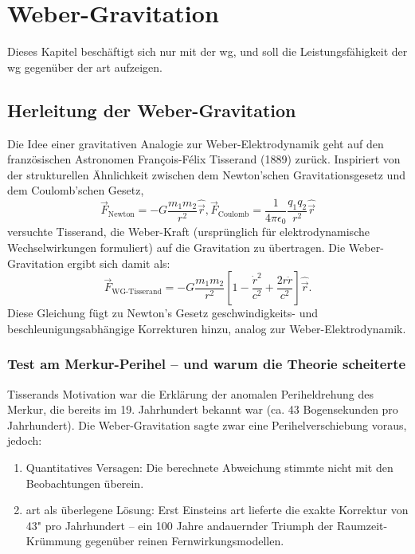 \chapter{Weber-Gravitation}
Dieses Kapitel beschäftigt sich nur mit der \gls{wg}, und soll die Leistungsfähigkeit der \gls{wg} gegenüber der \gls{art} aufzeigen.
\section{Herleitung der Weber-Gravitation}
Die Idee einer gravitativen Analogie zur Weber-Elektrodynamik geht auf den französischen Astronomen François-Félix Tisserand (1889) zurück. Inspiriert von der strukturellen
Ähnlichkeit zwischen dem Newton’schen Gravitationsgesetz und dem Coulomb’schen Gesetz,
\begin{equation}
    \vec{F}_{\text{Newton}} = -G \frac{m_1 m_2}{r^2} \hat{\vec{r}}, \vec{F}_{\text{Coulomb}} = \frac{1}{4 \pi \epsilon_0} \frac{q_1 q_2}{r^2} \hat{\vec{r}}
\end{equation}
versuchte Tisserand, die Weber-Kraft (ursprünglich für elektrodynamische Wechselwirkungen formuliert) auf die Gravitation zu übertragen. Die Weber-Gravitation ergibt sich damit als:
\begin{equation}
    \vec{F}_{\text{WG-Tisserand}} = -G \frac{m_1 m_2}{r^2} \left[ 1 - \frac{\dot{r}^2}{c^2} + \frac{2 r \ddot{r}}{c^2} \right] \hat{\vec{r}}.
\end{equation}
Diese Gleichung fügt zu Newton’s Gesetz geschwindigkeits- und beschleunigungsabhängige Korrekturen hinzu, analog zur Weber-Elektrodynamik.
\subsection{Test am Merkur-Perihel – und warum die Theorie scheiterte}
Tisserands Motivation war die Erklärung der anomalen Periheldrehung des Merkur, die bereits im 19. Jahrhundert bekannt war (ca. 43 Bogensekunden pro Jahrhundert).
Die Weber-Gravitation sagte zwar eine Perihelverschiebung voraus, jedoch:
\begin{enumerate}
    \item Quantitatives Versagen: Die berechnete Abweichung stimmte nicht mit den Beobachtungen überein.
    \item \gls{art} als überlegene Lösung: Erst Einsteins \gls{art} lieferte die exakte Korrektur von 43" pro Jahrhundert – ein 100 Jahre andauernder Triumph der
    Raumzeit-Krümmung gegenüber reinen Fernwirkungsmodellen.
\end{enumerate}

